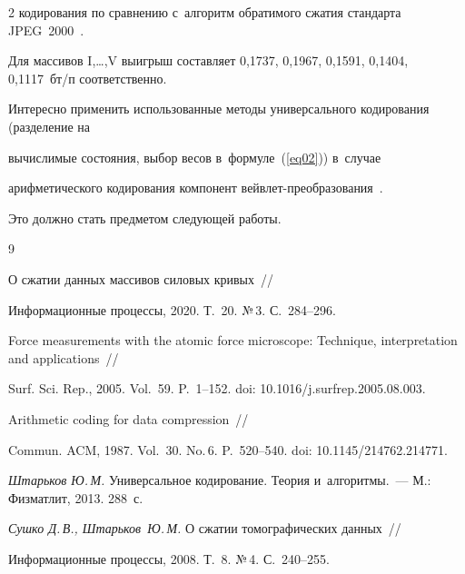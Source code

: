 \begin{multicols}{2}
 кодирования по сравнению с~алгоритм обратимого сжатия стандарта JPEG~2000~\cite{b1}. 

 Для массивов I,\dots,V выигрыш составляет 0,1737, 0,1967, 0,1591, 0,1404, 0,1117~бт/п со\-от\-вет\-ст\-венно.

 {

 

 }



Интересно применить использованные методы универсального кодирования (разделение на

 вычислимые состояния, выбор весов в~формуле~(\ref{eq02})) в~случае 

 арифметического кодирования компонент вейв\-лет-пре\-об\-ра\-зо\-ва\-ния~\cite{b1}. 

 Это должно стать предметом сле\-ду\-ющей работы.



{\small\frenchspacing

{%


\begin{thebibliography}{9}


 О сжатии данных массивов силовых кривых~// 

Информационные процессы, 2020. Т.~20. №\,3. С.~284--296.



Force measurements with the atomic force microscope: Technique, interpretation and applications~// 

Surf. Sci. Rep., 2005. Vol.~59. P.~1--152. doi: 10.1016/j.surfrep.2005.08.003.


 Arithmetic coding for data compression~// 

Commun.  ACM, 1987. Vol.~30. No.\,6. P.~520--540. doi: 10.1145/214762.214771.


{\it Штарьков Ю.\,М.} Универсальное кодирование. Теория и~алгоритмы.~--- М.: Физматлит, 2013. 288~с.


{\it Сушко Д.\,В., Штарьков~Ю.\,М.} О сжатии томографических данных~// 

Информационные процессы, 2008. Т.~8. №\,4. С.~240--255.



 \end{thebibliography}



}

}



\end{multicols}



